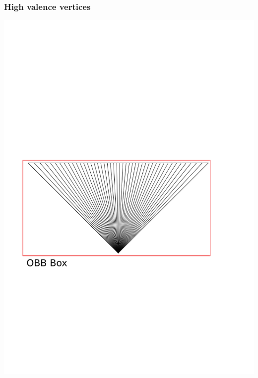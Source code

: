 \documentclass[14pt]{beamer}
\begin{document}
\begin{frame}
\frametitle{High valence vertices}
\begin{center}
\includegraphics[scale=0.6, trim = 0 0 0 250]{HV_1.png}
\end{center}
\end{frame}
\end{document}
